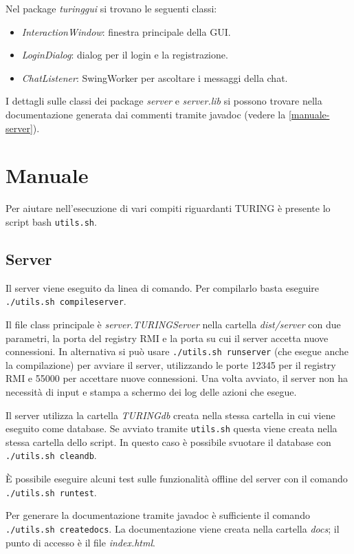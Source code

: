 \documentclass[a4paper]{article}
\theoremstyle{theorem}
\theoremstyle{remark}
\theoremstyle{definition}
\theoremstyle{corollary}
\theoremstyle{lemma}
\begin{document}
Nel package \textit{turinggui} si trovano le seguenti classi:
\begin{itemize}
	\item \textit{InteractionWindow}: finestra principale della GUI.
	\item \textit{LoginDialog}: dialog per il login e la registrazione.
	\item \textit{ChatListener}: SwingWorker per ascoltare i messaggi della chat.
\end{itemize}

I dettagli sulle classi dei package \textit{server} e \textit{server.lib} si possono trovare nella documentazione generata dai commenti tramite javadoc (vedere la \autoref{manuale-server}).

\section{Manuale}
Per aiutare nell'esecuzione di vari compiti riguardanti TURING è presente lo script bash \texttt{utils.sh}.

\subsection{Server}\label{manuale-server}
Il server viene eseguito da linea di comando. Per compilarlo basta eseguire \texttt{./utils.sh compileserver}.

Il file class principale è \textit{server.TURINGServer} nella cartella \textit{dist/server} con due parametri, la porta del registry RMI e la porta su cui il server accetta nuove connessioni.
In alternativa si può usare \texttt{./utils.sh runserver} (che esegue anche la compilazione) per avviare il server, utilizzando le porte 12345 per il registry RMI e 55000 per accettare nuove connessioni.
Una volta avviato, il server non ha necessità di input e stampa a schermo dei log delle azioni che esegue.

Il server utilizza la cartella \textit{TURINGdb} creata nella stessa cartella in cui viene eseguito come database. Se avviato tramite \texttt{utils.sh} questa viene creata nella stessa cartella dello script. In questo caso è possibile svuotare il database con \texttt{./utils.sh cleandb}.

È possibile eseguire alcuni test sulle funzionalità offline del server con il comando \texttt{./utils.sh runtest}.

Per generare la documentazione tramite javadoc è sufficiente il comando \texttt{./utils.sh createdocs}. La documentazione viene creata nella cartella \textit{docs}; il punto di accesso è il file \textit{index.html}.
\end{document}
